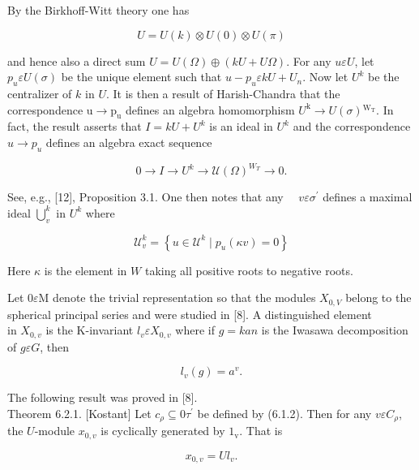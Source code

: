 \documentclass[10pt]{article}
\begin{document}
By the Birkhoff-Witt theory one has


\begin{equation*}
U=U(k) \otimes U(0) \otimes U(\pi) \tag{6.2.1}
\end{equation*}


and hence also a direct sum $U=U(\Omega) \oplus(k U+U \Omega)$. For any $u \varepsilon U$, let $p_{u} \varepsilon U(\sigma)$ be the unique element such that $u-p_{u} \varepsilon k U+U_{n}$. Now let $U^{k}$ be the centralizer of $k$ in $U$. It is then a result of Harish-Chandra that the correspondence $\mathrm{u} \rightarrow \mathrm{p}_{\mathrm{u}}$ defines an algebra homomorphism $U^{\mathrm{k}} \rightarrow U(\sigma){ }^{\mathrm{W}_{\mathrm{T}}}$. In fact, the result asserts that $I=k U+U^{k}$ is an ideal in $U^{k}$ and the correspondence $u \rightarrow p_{u}$ defines an algebra exact sequence


\begin{equation*}
0 \rightarrow I \rightarrow U^{k} \rightarrow \mathcal{U}(\Omega)^{W_{T}} \rightarrow 0 . \tag{6.2.2}
\end{equation*}


See, e.g., [12], Proposition 3.1. One then notes that any $\quad v \varepsilon \sigma^{\prime}$ defines a maximal ideal $\bigcup_{v}^{k}$ in $U^{k}$ where

$$
\mathcal{U}_{v}^{k}=\left\{u \in \mathcal{U}^{k} \mid p_{u}(\kappa v)=0\right\}
$$

Here $\kappa$ is the element in $W$ taking all positive roots to negative roots.

Let $0 \varepsilon \mathrm{M}$ denote the trivial representation so that the modules $X_{0, V}$ belong to the spherical principal series and were studied in [8]. A distinguished element\\
in $X_{0, v}$ is the K-invariant $l_{v} \varepsilon X_{0, v}$ where if $g=k a n$ is the Iwasawa decomposition of $g \varepsilon G$, then


\begin{equation*}
l_{v}(g)=a^{v} . \tag{6.2.3}
\end{equation*}


The following result was proved in [8].\\[0pt]
Theorem 6.2.1. [Kostant] Let $c_{\rho} \subseteq 0 \tau^{\prime}$ be defined by (6.1.2). Then for any $v \varepsilon C_{\rho}$, the $U$-module $x_{0, v}$ is cyclically generated by $1_{\mathrm{v}}$. That is

$$
x_{0, v}=U l_{v} .
$$
\end{document}
